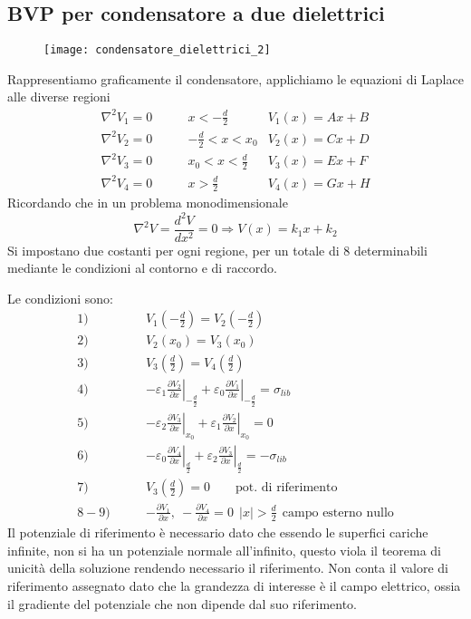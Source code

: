 \subsection{BVP per condensatore a due dielettrici}
\begin{figure}[H]
\centering
\texttt{[image: condensatore\_dielettrici\_2]}
\end{figure}
Rappresentiamo graficamente il condensatore, applichiamo le equazioni
di Laplace alle diverse regioni
\begin{align*}
\nabla^2 V_1 = 0 \qquad & x< -\frac{d}{2} & V_1(x) = Ax + B\\
\nabla^2 V_2 = 0 \qquad & -\frac{d}{2} < x < x_0 & V_2(x) = Cx + D\\
\nabla^2 V_3 = 0 \qquad & x_0 < x < \frac{d}{2} & V_3(x) = Ex + F \\
\nabla^2 V_4 = 0 \qquad & x > \frac{d}{2} & V_4(x) = Gx + H
\end{align*}
Ricordando che in un problema monodimensionale
$$
\nabla^2 V = \frac{d^2 V}{dx^2} = 0 \Rightarrow V(x) = k_1x + k_2
$$
Si impostano due costanti per ogni regione, per un totale di 8
determinabili mediante le condizioni al contorno e di raccordo.

Le condizioni sono:
\begin{align*}
1) \qquad &V_1\left(-\frac{d}{2}\right) = V_2\left(-\frac{d}{2}\right)\\
2) \qquad &V_2\left(x_0\right) = V_3\left(x_0\right)\\
3) \qquad &V_3\left(\frac{d}{2}\right) = V_4\left(\frac{d}{2}\right)\\
4) \qquad  &
-\varepsilon_1 \left.\frac{\partial V_2}{\partial x}\right|_{-\frac{d}{2}} +
\varepsilon_0 \left.\frac{\partial V_1}{\partial x}\right|_{-\frac{d}{2}} = 
\sigma_{lib}\\
5) \qquad &-\varepsilon_2 \left.\frac{\partial V_3}{\partial x}\right|_{x_0} +
\varepsilon_1 \left.\frac{\partial V_2}{\partial x}\right|_{x_0} = 
0\\
6) \qquad &-\varepsilon_0 \left.\frac{\partial V_4}{\partial x}\right|_{\frac{d}{2}} +
\varepsilon_2 \left.\frac{\partial V_3}{\partial x}\right|_{\frac{d}{2}} = 
-\sigma_{lib}\\
7) \qquad &V_3\left(\frac{d}{2}\right) = 0 \qquad \text{pot. di riferimento}\\
8-9) \qquad& -\frac{\partial V_1}{\partial x} ,\ -\frac{\partial V_4}{\partial x} = 0\ \ |x| > \frac{d}{2}\ \ \text{campo esterno nullo}
\end{align*}
Il potenziale di riferimento è necessario dato che essendo le superfici cariche 
infinite, non si ha un potenziale normale all'infinito, questo
viola il teorema di unicità della soluzione rendendo necessario il riferimento.
Non conta il valore di riferimento assegnato dato che la grandezza di interesse
è il campo elettrico, ossia il gradiente del potenziale che non dipende
dal suo riferimento.

